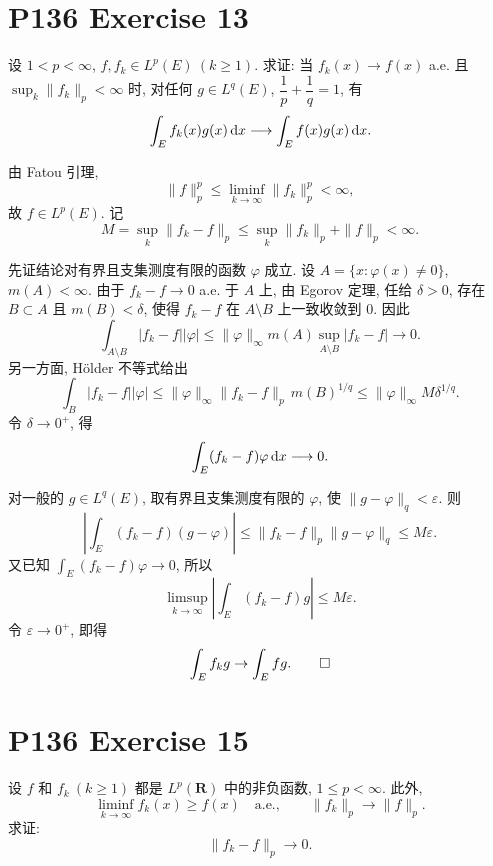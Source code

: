 \documentclass{article}
\begin{document}
\section{P136 Exercise 13}

设 $1<p<\infty$, $f,f_k\in L^p(E)\ (k\ge1)$. 求证: 当
$f_k(x)\to f(x)$ a.e. 且 $\sup_k\|f_k\|_p<\infty$ 时, 对任何
$g\in L^q(E)$, $\dfrac1p+\dfrac1q=1$, 有
\[
  \int_E f_k(x)g(x)\,\mathrm{d} x
  \longrightarrow
  \int_E f(x)g(x)\,\mathrm{d} x.
\]

\begin{solution}
  由 Fatou 引理,
  \[
    \|f\|_p^p
    \le \liminf_{k\to\infty}\|f_k\|_p^p<\infty,
  \]
  故 $f\in L^p(E)$. 记
  \[
    M=\sup_k\|f_k-f\|_p
    \le \sup_k\|f_k\|_p+\|f\|_p<\infty.
  \]

  先证结论对有界且支集测度有限的函数 $\varphi$ 成立. 设
  $A=\{x:\varphi(x)\ne0\}$, $m(A)<\infty$. 由于 $f_k-f\to0$ a.e. 于
  $A$ 上, 由 Egorov 定理, 任给 $\delta>0$, 存在
  $B\subset A$ 且 $m(B)<\delta$, 使得 $f_k-f$ 在 $A\setminus B$ 上一致收敛到 $0$.
  因此
  \[
    \int_{A\setminus B}|f_k-f||\varphi|
    \le \|\varphi\|_\infty m(A)
      \sup_{A\setminus B}|f_k-f|
    \longrightarrow0.
  \]
  另一方面, Hölder 不等式给出
  \[
    \int_B|f_k-f||\varphi|
    \le \|\varphi\|_\infty\|f_k-f\|_p\,m(B)^{1/q}
    \le \|\varphi\|_\infty M\delta^{1/q}.
  \]
  令 $\delta\to0^+$, 得
  \[
    \int_E(f_k-f)\varphi\,\mathrm{d} x\longrightarrow0.
  \]

  对一般的 $g\in L^q(E)$, 取有界且支集测度有限的 $\varphi$, 使
  $\|g-\varphi\|_q<\varepsilon$. 则
  \[
    \left|\int_E(f_k-f)(g-\varphi)\right|
    \le \|f_k-f\|_p\|g-\varphi\|_q
    \le M\varepsilon.
  \]
  又已知 $\int_E(f_k-f)\varphi\to0$, 所以
  \[
    \limsup_{k\to\infty}
    \left|\int_E(f_k-f)g\right|
    \le M\varepsilon.
  \]
  令 $\varepsilon\to0^+$, 即得
  \[
    \int_E f_k g\to\int_E fg. \qed
  \]
\end{solution}

\section{P136 Exercise 15}

设 $f$ 和 $f_k\ (k\ge1)$ 都是 $L^p(\mathbf R)$ 中的非负函数,
$1\le p<\infty$. 此外,
\[
  \liminf_{k\to\infty} f_k(x)\ge f(x)\quad \text{a.e.},\qquad
  \|f_k\|_p\to\|f\|_p.
\]
求证:
\[
  \|f_k-f\|_p\to0.
\]
\end{document}
